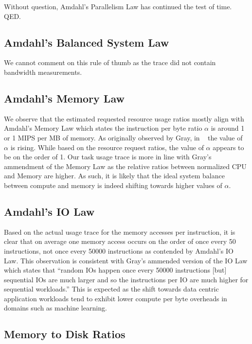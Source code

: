 \documentclass{sig-alternate}
\begin{document}
Without question, Amdahl's Parallelism Law has continued the test of time. QED.

\subsection{Amdahl's Balanced System Law}

We cannot comment on this rule of thumb as the trace did not contain bandwidth measurements.

\subsection{Amdahl's Memory Law}

We observe that the estimated requested resource usage ratios mostly align with Amdahl's Memory Law which states the instruction per byte ratio $\alpha$ is around 1 or 1 MIPS per MB of memory.
As originally observed by Gray, in ~\cite{export:68636} the value of $\alpha$ is rising.
While based on the resource request ratios, the value of $\alpha$ appears to be on the order of 1.
Our task usage trace is more in line with Gray's ammendment of the Memory Law as the relative ratios between normalized CPU and Memory are higher. 
As such, it is likely that the ideal system balance between compute and memory is indeed shifting towards higher values of $\alpha$.

\subsection{Amdahl's IO Law}

Based on the actual usage trace for the memory accesses per instruction, it is clear that on average one memory access occurs on the order of once every 50 instructions, not once every 50000 instructions as contended by Amdahl's IO Law.
This observation is consistent with Gray's ammended version of the IO Law which states that ``random IOs happen once every 50000 instructions [but] sequential IOs are much larger and so the instructions per IO are much higher for sequential workloads.''
This is expected as the shift towards data centric application workloads tend to exhibit lower compute per byte overheads in domains such as machine learning.

\subsection{Memory to Disk Ratios}
\end{document}
